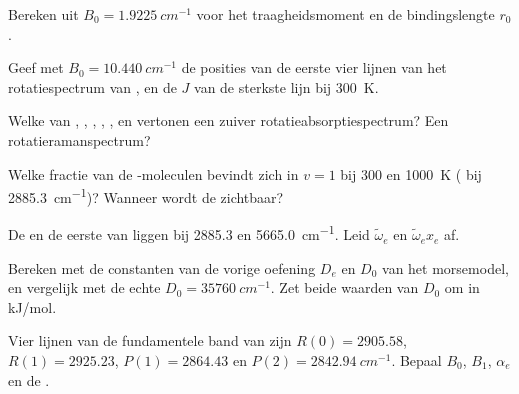 \begin{exercise}[$\star$]\label{exo:b3:rovibrational-spectroscopy:1}
Bereken uit $B_0 = \qty{1.9225}{cm^{-1}}$ voor  het
traagheidsmoment en de bindingslengte $r_0$.
\end{exercise}

\begin{exercise}[$\star$]\label{exo:b3:rovibrational-spectroscopy:2}
Geef met $B_0 = \qty{10.440}{cm^{-1}}$ de posities van de eerste vier
lijnen van het rotatiespectrum van , en de $J$ van de sterkste lijn bij
\qty{300}{K}.
\end{exercise}

\begin{exercise}[$\star$]\label{exo:b3:rovibrational-spectroscopy:3}
Welke van , , , , ,  en  vertonen
een zuiver rotatieabsorptiespectrum? Een rotatieramanspectrum?
\end{exercise}

\begin{exercise}[$\star$]\label{exo:b3:rovibrational-spectroscopy:4}
Welke fractie van de -moleculen bevindt zich in $v = 1$ bij 300 en
\qty{1000}{K} ( bij \qty{2885.3}{cm^{-1}})? Wanneer
wordt de  zichtbaar?
\end{exercise}

\begin{exercise}[$\star\star$]\label{exo:b3:rovibrational-spectroscopy:5}
De  en de eerste  van  liggen
bij 2885.3 en
\qty{5665.0}{cm^{-1}}. Leid $\tilde\omega_e$ en $\tilde\omega_ex_e$ af.
\end{exercise}

\begin{exercise}[$\star\star$]\label{exo:b3:rovibrational-spectroscopy:6}
Bereken met de constanten van de vorige oefening $D_e$ en $D_0$ van het
morsemodel, en vergelijk met de echte $D_0 = \qty{35760}{cm^{-1}}$. Zet beide
waarden van $D_0$ om in \unit{kJ/mol}.
\end{exercise}

\begin{exercise}[$\star\star$]\label{exo:b3:rovibrational-spectroscopy:7}
Vier lijnen van de fundamentele band van  zijn $R(0) = 2905.58$, $R(1) = 2925.23$,
$P(1) = 2864.43$ en $P(2) = \qty{2842.94}{cm^{-1}}$. Bepaal $B_0$, $B_1$, $\alpha_e$ en
de .
\end{exercise}

